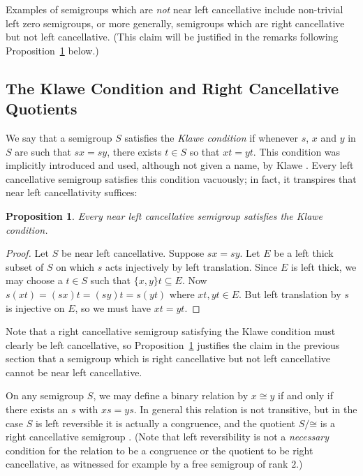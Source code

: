 \documentclass[11pt,a4paper,reqno]{amsart}
\newtheorem{proposition}[theorem]{Proposition}
\begin{document}
Examples of semigroups which are \textit{not} near left cancellative
include non-trivial left zero semigroups, or more generally, semigroups
which are right cancellative but not left cancellative. (This claim will
be justified in the remarks following Proposition~\ref{prop_alcklawe} below.)

\subsection{The Klawe Condition and Right Cancellative Quotients}

We say that a semigroup $S$ satisfies the \textit{Klawe condition} if
whenever $s$, $x$ and $y$ in $S$ are such that $sx = sy$, there exists
$t \in S$ so that $xt = yt$. This condition was implicitly introduced and
used, although not given a name, by Klawe \cite{Klawe77}. Every left
cancellative semigroup satisfies
this condition vacuously; in fact, it transpires that
near left cancellativity suffices:
\begin{proposition}\label{prop_alcklawe}
Every near left cancellative semigroup satisfies the Klawe condition.
\end{proposition}
\begin{proof}
Let $S$ be near left cancellative. Suppose $sx = sy$. Let $E$ be a left
thick subset of $S$ on which $s$
acts injectively by left translation. Since $E$ is left thick, we may
choose a $t \in S$ such that $\lbrace x,y \rbrace t \subseteq E$. Now
$s(xt) = (sx) t = (sy) t = s(yt)$ where $xt, yt \in E$. But left translation
by $s$ is injective on $E$, so we must have $xt = yt$.
\end{proof}

Note that a right cancellative semigroup satisfying the Klawe condition
must clearly be left cancellative, so Proposition~\ref{prop_alcklawe}
justifies the claim in the previous section that a semigroup which is
right cancellative but not left cancellative cannot be near left
cancellative.

On any semigroup $S$, we may define a binary relation by $x \cong y$ if and
only if there exists an $s$ with $xs = ys$. In general this relation is not
transitive, but in the case $S$ is left reversible it is actually
a congruence, and the quotient $S / \mathord{\cong}$ is a right cancellative
semigroup \cite[Proposition~1.24]{Paterson88}. (Note that left reversibility
is not a \textit{necessary} condition for the relation to be a congruence or
the quotient to be right cancellative, as witnessed for example by a free
semigroup of rank $2$.)
\end{document}
